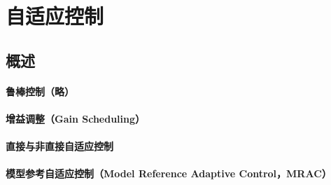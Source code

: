 \chapter{自适应控制}\label{cp5}
\section{概述}

\subsubsection*{鲁棒控制（略）}

\subsubsection*{增益调整（Gain Scheduling）}

\subsubsection*{直接与非直接自适应控制}

\subsubsection*{模型参考自适应控制（Model Reference Adaptive Control，MRAC）}